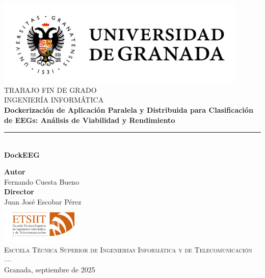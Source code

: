 \begin{titlepage}


\newlength{\centeroffset}
\setlength{\centeroffset}{-0.5\oddsidemargin}
\addtolength{\centeroffset}{0.5\evensidemargin}
\thispagestyle{empty}

\noindent\hspace*{\centeroffset}\begin{minipage}{\textwidth}

\centering
\includegraphics[width=0.9\textwidth]{imagenes/logo_ugr.jpg}\\[1.2cm]

\textsc{ \Large TRABAJO FIN DE GRADO\\[0.2cm]}
\textsc{INGENIERÍA INFORMÁTICA}\\[1cm]
%
{\Huge\bfseries Dockerización de Aplicación Paralela y Distribuida para Clasificación de EEGs: Análisis de Viabilidad y Rendimiento\\
}
\noindent\rule[-1ex]{\textwidth}{3pt}\\[3.5ex]
{\large\bfseries DockEEG}
\end{minipage}

\vspace{2.5cm}
\noindent\hspace*{\centeroffset}\begin{minipage}{\textwidth}
\centering

\textbf{Autor}\\ {Fernando Cuesta Bueno}\\[2.5ex]
\textbf{Director}\\
{Juan José Escobar Pérez}\\[2cm]
\includegraphics[width=0.3\textwidth]{imagenes/etsiit_logo.png}\\[0.1cm]
\textsc{Escuela Técnica Superior de Ingenierías Informática y de Telecomunicación}\\
\textsc{---}\\
Granada, septiembre de 2025
\end{minipage}
\end{titlepage}


